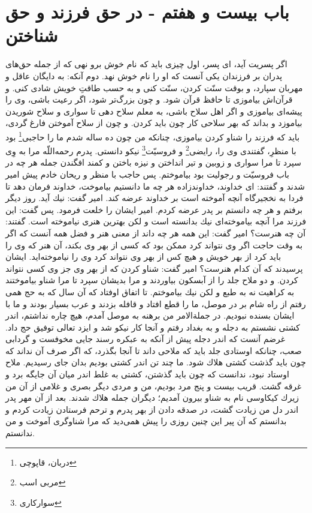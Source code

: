 \section*{باب بیست و هفتم - در حق فرزند و حق شناختن}

اگر پسريت آيد، اى پسر، اول چيزى بايد كه نام خوش برو نهى كه از جمله حق‌هاى پدران بر فرزندان يكى آنست كه او را نام خوش نهد. دوم آنكه: 
به دايگان عاقل و مهربان سپارد، و بوقت سنّت كردن، سنّت كنى و به حسب طاقتِ خويش شادى كنى. و قرآن‌اش بياموزى تا حافظ قرآن شود. و چون بزرگ‌تر شود، اگر رعيت باشى، وى را پيشه‌اى بياموزى و اگر اهل سلاح باشى، به معلم سلاح دهى تا سوارى و سلاح شوريدن بياموزد و بداند كه بهر سلاحى كار چون بايد كردن. و چون از سلاح آموختن فارغ گردى، بايد كه فرزند را شناو كردن بياموزى، چنانكه من چون ده ساله شدم ما را حاجبى\footnote{دربان، قاپوچی} بود با منظرِ، گفتندى وى را، رايضى\footnote{مربی اسب} و فروسيّت\footnote{سوارکاری} نيكو دانستى. پدرم رحمه‌اللّه مرا به وِى سپرد تا مرا سوارى و زوبين و تير انداختن و نيزه باختن و كمند افگندن جمله هر چه در باب فروسيّت و رجوليت بود بياموختم. پس حاجب با منظر و ريحان خادم پيش امير شدند و گفتند: اى خداوند، خداوندزاده هر چه ما دانستيم بياموخت، خداوند فرمان دهد تا فردا به نخجيرگاه آنچه آموخته است بر خداوند عرضه كند. امير گفت: نيك آيد. روز ديگر برفتم و هر چه دانستم بر پدر عرضه كردم. امير ايشان را خلعت فرمود. پس گفت: اين فرزند مرا آنچه بياموخته‌اى نيك بدانسته است و لكن بهترين هنرى نياموخته است. گفتند: آن چه هنرست‌؟ امير گفت: اين همه هر چه داند از معنى هنر و فضل همه آنست كه اگر به وقت حاجت اگر وى نتواند كرد ممكن بود كه كسى از بهر وى بكند، آن هنر كه وى را بايد كرد از بهر خويش و هيچ كس از بهر وى نتواند كرد وى را نياموخته‌ايد. ايشان پرسيدند كه آن كدام هنرست‌؟ امير گفت: شناو كردن كه از بهر وى جز وى كسى نتواند كردن. و دو ملاح جلد را از آبسكون بياوردند و مرا بديشان سپرد تا مرا شناو بياموختند به كراهيت نه به طبع و لكن نيك بياموختم. تا اتفاق اوفتاد كه آن سال كه به حج همى رفتم از راه شام بر در موصل، ما را قطع افتاد و قافله بزدند و عرب بسيار بودند و ما با ايشان بسنده نبوديم. در جملة‌الامر من برهنه به موصل آمدم، هيچ چاره نداشتم، اندر كشتى نشستم به دجله و به بغداد رفتم و آنجا كار نيكو شد و ايزد تعالى توفيق حج داد. غرضم آنست كه اندر دجله پيش از آنكه به عبكره رسند جايى مخوفست و گردابى صعب، چنانكه اوستادى جلد بايد كه ملاحى داند تا آنجا بگذرد، كه اگر صرف آن نداند كه چون بايد گذشت كشتى هلاك شود. ما چند تن اندر كشتى بوديم بدان جاى رسيديم. ملاح اوستاد نبود، ندانست كه چون بايد گذشتن، كشتى به غلط اندر ميان آن جايگه برد و غرقه گشت. قريب بيست و پنج مرد بوديم، من و مردى ديگر بصرى و غلامى از آن من زيرك كيكاوسى نام به شناو بيرون آمديم؛ ديگران جمله هلاك شدند. بعد از آن مهر پدر اندر دل من زيادت گشت، در صدقه دادن از بهر پدرم و ترحم فرستادن زيادت كردم و بدانستم كه آن پير اين چنين روزى را پيش همى‌ديد كه مرا شناوگرى آموخت و من ندانستم.


